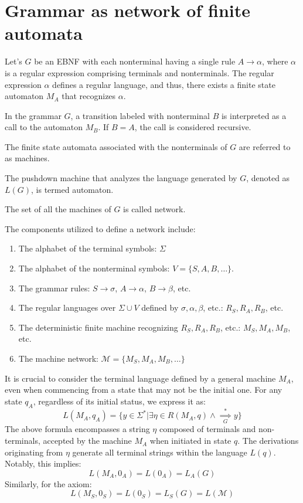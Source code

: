 \section{Grammar as network of finite automata}

Let's $G$ be an EBNF with each nonterminal having a single rule $A \rightarrow \alpha$, where $\alpha$ is a regular expression comprising terminals and nonterminals.
The regular expression $\alpha$ defines a regular language, and thus, there exists a finite state automaton $M_A$ that recognizes $\alpha$.

In the grammar $G$, a transition labeled with nonterminal $B$ is interpreted as a call to the automaton $M_B$.
If $B=A$, the call is considered recursive.

\begin{definition}
    The finite state automata associated with the nonterminals of $G$ are referred to as machines. 
\end{definition}
\begin{definition}
    The pushdown machine that analyzes the language generated by $G$, denoted as $L(G)$, is termed automaton. 
\end{definition}
\begin{definition}
    The set of all the machines of $G$ is called network.
\end{definition}
The components utilized to define a network include:
\begin{enumerate}
    \item The alphabet of the terminal symbols: $\Sigma$
    \item The alphabet of the nonterminal symbols: $V=\{S,A,B,\dots\}$.
    \item The grammar rules: $S \rightarrow \sigma$, $A \rightarrow \alpha$, $B \rightarrow \beta$, etc. 
    \item The regular languages over $\Sigma \cup V$ defined by $\sigma, \alpha, \beta$, etc.: $R_S,R_A,R_B$, etc. 
    \item The deterministic finite machine recognizing $R_S,R_A,R_B$, etc.: $M_S,M_A,M_B$, etc. 
    \item The machine network: $\mathcal{M}=\{M_S,M_A,M_B,\dots\}$
\end{enumerate}

It is crucial to consider the terminal language defined by a general machine $M_A$, even when commencing from a state that may not be the initial one.
For any state $q_A$, regardless of its initial status, we express it as:
\[L(M_A,q_A)=\{y \in \Sigma^{*}|\exists\eta\in R(M_A,q) \land \overset{*}{\underset{G}{\implies}} y\}\]
The above formula encompasses a string $\eta$ composed of terminals and non-terminals, accepted by the machine $M_A$ when initiated in state $q$. 
The derivations originating from $\eta$ generate all terminal strings within the language $L(q)$. 
Notably, this implies:
\[L(M_A,0_A)=L(0_A) = L_A(G)\]
Similarly, for the axiom:
\[L(M_S,0_S)=L(0_S)=L_S(G) = L(\mathcal{M})\]

